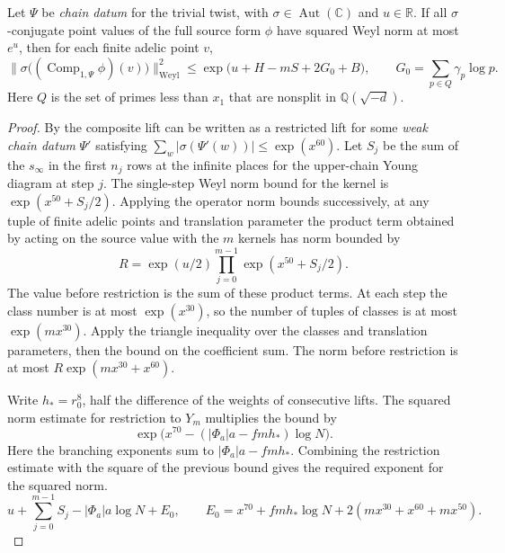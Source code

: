 \begin{lemma}
\label{lem:a-composite-size}
\emitthmsource
Let $\Psi$ be \emph{chain datum} for the trivial twist, with $\sigma\in\operatorname{Aut}(\mathbb C)$ and $u\in\mathbb R$. If all $\sigma$-conjugate point values of the full source form $\phi$ have squared Weyl norm at most $e^u$, then for each finite adelic point $v$,
\[
 \bigl\|\sigma\bigl((\operatorname{Comp}_{1,\Psi}\phi)(v)\bigr)
 \bigr\|^2_{\mathrm{Weyl}}
 \le \exp\bigl(u+H-mS+2G_0+B\bigr),
 \qquad
 G_0=\sum_{p\in Q}\gamma_p\log p .
\]
Here $Q$ is the set of primes less than $x_1$ that are nonsplit in $\mathbb Q(\sqrt{-d})$.
\end{lemma}
\begin{proof}
By  the composite lift can be written as a restricted lift for some \emph{weak chain datum} $\Psi'$ satisfying $\sum_w|\sigma(\Psi'(w))|\le\exp(x^{60})$. Let $S_j$ be the sum of the $s_\infty$ in the first $n_j$ rows at the infinite places for the upper-chain Young diagram at step $j$. The single-step Weyl norm bound for the kernel is $\exp(x^{50}+S_j/2)$. Applying the operator norm bounds successively, at any tuple of finite adelic points and translation parameter the product term obtained by acting on the source value with the $m$ kernels has norm bounded by
\[
 R=\exp(u/2)\prod_{j=0}^{m-1}\exp(x^{50}+S_j/2).
\]
The value before restriction is the sum of these product terms. At each step the class number is at most $\exp(x^{30})$, so the number of tuples of classes is at most $\exp(mx^{30})$. Apply the triangle inequality over the classes and translation parameters, then the bound on the coefficient sum. The norm before restriction is at most $R\exp(mx^{30}+x^{60})$.

Write $h_*=r_0^8$, half the difference of the weights of consecutive lifts. The squared norm estimate for restriction to $Y_m$ multiplies the bound by
\[
 \exp\bigl(x^{70}-(|\Phi_a|a-fmh_*)\log N\bigr).
\]
Here the branching exponents sum to $|\Phi_a|a-fmh_*$. Combining the restriction estimate with the square of the previous bound gives the required exponent for the squared norm.
\[
 u+\sum_{j=0}^{m-1} S_j- |\Phi_a|a\log N+E_0,
 \qquad
 E_0=x^{70}+fmh_*\log N+2(mx^{30}+x^{60}+mx^{50}).
\]


\end{proof}
